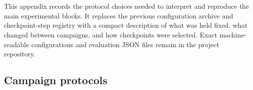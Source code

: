 \chapter{\texorpdfstring{}{Reproducibility Summary}}
\label{app:reproducibility-summary}
\label{app:experiment-configurations}

{\color{red}
This appendix records the protocol choices needed to interpret and reproduce
the main experimental blocks. It replaces the previous configuration archive
and checkpoint-step registry with a compact description of what was held fixed,
what changed between campaigns, and how checkpoints were selected. Exact
machine-readable configurations and evaluation JSON files remain in the
project repository.

\section{Campaign protocols}

}
